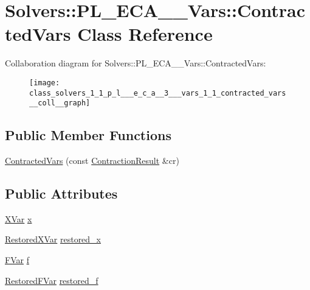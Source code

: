 \hypertarget{class_solvers_1_1_p_l___e_c_a__3___vars_1_1_contracted_vars}{}\section{Solvers\+:\+:P\+L\+\_\+\+E\+C\+A\+\_\+\_\+\+Vars\+:\+:Contracted\+Vars Class Reference}
\label{class_solvers_1_1_p_l___e_c_a__3___vars_1_1_contracted_vars}


Collaboration diagram for Solvers\+:\+:P\+L\+\_\+\+E\+C\+A\+\_\+\_\+\+Vars\+:\+:Contracted\+Vars\+:\nopagebreak
\begin{figure}[H]
\begin{center}
\leavevmode
\texttt{[image: class\_solvers\_1\_1\_p\_l\_\_\_e\_c\_a\_\_3\_\_\_vars\_1\_1\_contracted\_vars\_\_coll\_\_graph]}
\end{center}
\end{figure}
\subsection*{Public Member Functions}
\begin{DoxyCompactItemize}
\item 
\hyperlink{class_solvers_1_1_p_l___e_c_a__3___vars_1_1_contracted_vars_a009b20895de54f1395647d5d0f11f79e}{Contracted\+Vars} (const \hyperlink{class_contraction_result}{Contraction\+Result} \&cr)
\end{DoxyCompactItemize}
\subsection*{Public Attributes}
\begin{DoxyCompactItemize}
\item 
\hyperlink{class_solvers_1_1_p_l___e_c_a__3___vars_1_1_x_var}{X\+Var} \hyperlink{class_solvers_1_1_p_l___e_c_a__3___vars_1_1_contracted_vars_a514a3404b83c008b3273eccf66bb6fcb}{x}
\item 
\hyperlink{class_solvers_1_1_p_l___e_c_a__3___vars_1_1_restored_x_var}{Restored\+X\+Var} \hyperlink{class_solvers_1_1_p_l___e_c_a__3___vars_1_1_contracted_vars_a3ae6936df398cd301edd534f11129e11}{restored\+\_\+x}
\item 
\hyperlink{class_solvers_1_1_p_l___e_c_a__3___vars_1_1_f_var}{F\+Var} \hyperlink{class_solvers_1_1_p_l___e_c_a__3___vars_1_1_contracted_vars_a746123dd243f06f242afa1d946b96c21}{f}
\item 
\hyperlink{class_solvers_1_1_p_l___e_c_a__3___vars_1_1_restored_f_var}{Restored\+F\+Var} \hyperlink{class_solvers_1_1_p_l___e_c_a__3___vars_1_1_contracted_vars_a566857b0095b735578b548cce057f904}{restored\+\_\+f}
\end{DoxyCompactItemize}


